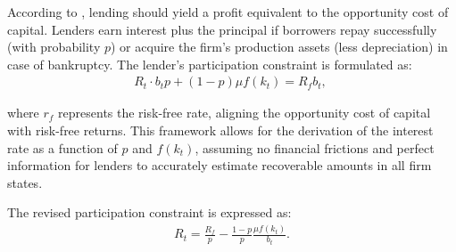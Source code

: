 \documentclass[12pt]{article}
\begin{document}
According to \cite{BerGer86}, lending should yield a profit equivalent to the opportunity cost of capital. Lenders earn
interest plus the principal if borrowers repay successfully (with probability \(p\)) or acquire the firm's production
assets (less depreciation) in case of bankruptcy. The lender's participation constraint is formulated as:
\begin{align*}
    R_t \cdot b_t p + (1-p) \mu f(k_t) = R_f b_t, \
\end{align*}

where \(r_f\) represents the risk-free rate, aligning the opportunity cost of capital with risk-free returns. This
framework allows for  the derivation of the interest rate as a function of \(p\) and \(f(k_t)\), assuming no financial
frictions and perfect information for lenders to accurately estimate recoverable amounts in all firm states.

The revised participation constraint is expressed as:
\begin{align}
    R_t=\frac{R_f}{p}  -\frac{ 1-p }{ p }\frac{\mu f(k_t)}{b_t}. \label{eq21}
\end{align}
\end{document}

